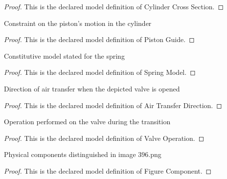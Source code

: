 \begin{proof}
  This is the declared model definition of Cylinder Cross Section.
\end{proof}
\begin{definition}
  \label{def:physics:phyx-mini-0396:phyxminiproblems-problemphyxmini0396-pistonguide}
  Constraint on the piston's motion in the cylinder
\end{definition}
\begin{proof}
  This is the declared model definition of Piston Guide.
\end{proof}
\begin{definition}
  \label{def:physics:phyx-mini-0396:phyxminiproblems-problemphyxmini0396-springmodel}
  Constitutive model stated for the spring
\end{definition}
\begin{proof}
  This is the declared model definition of Spring Model.
\end{proof}
\begin{definition}
  \label{def:physics:phyx-mini-0396:phyxminiproblems-problemphyxmini0396-airtransferdirection}
  Direction of air transfer when the depicted valve is opened
\end{definition}
\begin{proof}
  This is the declared model definition of Air Transfer Direction.
\end{proof}
\begin{definition}
  \label{def:physics:phyx-mini-0396:phyxminiproblems-problemphyxmini0396-valveoperation}
  Operation performed on the valve during the transition
\end{definition}
\begin{proof}
  This is the declared model definition of Valve Operation.
\end{proof}
\begin{definition}
  \label{def:physics:phyx-mini-0396:phyxminiproblems-problemphyxmini0396-figurecomponent}
  Physical components distinguished in image 396.png
\end{definition}
\begin{proof}
  This is the declared model definition of Figure Component.
\end{proof}
